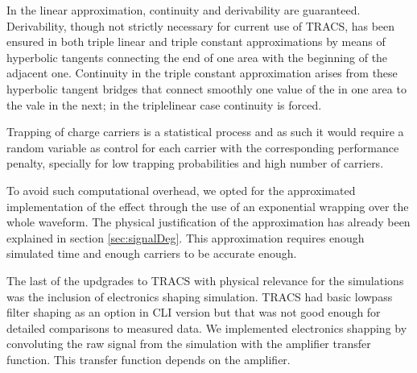 In the linear approximation, continuity and derivability are guaranteed. Derivability, though not strictly necessary for current use of TRACS, has been ensured in both triple linear and triple constant approximations by means of hyperbolic tangents connecting the end of one area with the beginning of the adjacent one. Continuity in the triple constant approximation arises from these hyperbolic tangent bridges that connect smoothly one value of the \neff in one area to the vale in the next; in the triplelinear case continuity is forced. 

Trapping of charge carriers is a statistical process and as such it would require a random variable as control for each carrier with the corresponding performance penalty, specially for low trapping probabilities and high number of carriers.

To avoid such computational overhead, we opted for the approximated implementation of the effect through the use of an exponential wrapping over the whole waveform. The physical justification of the approximation has already been explained in section \ref{sec:signalDeg}. This approximation requires enough simulated time and enough carriers to be accurate enough.

The last of the updgrades to TRACS with physical relevance for the simulations was the inclusion of electronics shaping simulation. TRACS had basic lowpass filter shaping as an option in CLI version but that was not good enough for detailed comparisons to measured data. We implemented electronics shapping by convoluting the raw signal from the simulation with the amplifier transfer function. This transfer function depends  on the amplifier.



